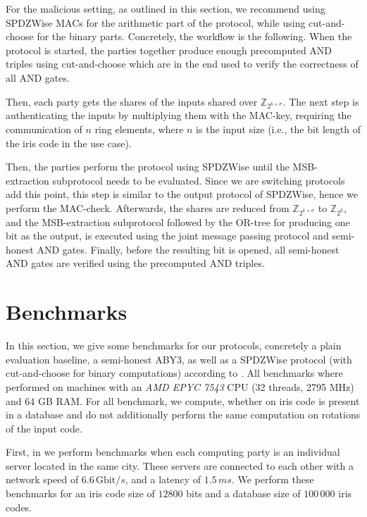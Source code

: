 \documentclass[a4paper,11pt,
]{article}
\newcommand{\Z}{\ensuremath{\mathbb{Z}}\xspace}
\begin{document}
For the malicious setting, as outlined in this section, we recommend using SPDZWise MACs  for the arithmetic part of the protocol, while using cut-and-choose  for the binary parts. Concretely, the workflow is the following. When the protocol is started, the parties together produce enough precomputed AND triples using cut-and-choose which are in the end used to verify the correctness of all AND gates.

Then, each party gets the shares of the inputs shared over $\Z_{2^{k + \sigma}}$. The next step is authenticating the inputs by multiplying them with the MAC-key, requiring the communication of $n$ ring elements, where $n$ is the input size (i.e., the bit length of the iris code in the use case).

Then, the parties perform the protocol using SPDZWise until the MSB-extraction subprotocol needs to be evaluated. Since we are switching protocols add this point, this step is similar to the output protocol of SPDZWise, hence we perform the MAC-check. Afterwards, the shares are reduced from $\Z_{2^{k + \sigma}}$ to $\Z_{2^k}$, and the MSB-extraction subprotocol followed by the OR-tree for producing one bit as the output, is executed using the joint message passing protocol and semi-honest AND gates. Finally, before the resulting bit is opened, all semi-honest AND gates are verified using the precomputed AND triples.


\section{Benchmarks} \label{sec::bench}

In this section, we give some benchmarks for our protocols, concretely a plain evaluation baseline, a semi-honest ABY3, as well as a SPDZWise protocol (with cut-and-choose for binary computations) according to . All benchmarks where performed on machines with an \textit{AMD EPYC 7543} CPU (32 threads, 2795 MHz) and 64 GB RAM. For all benchmark, we compute, whether on iris code is present in a database and do not additionally perform the same computation on rotations of the input code.

First, in  we perform benchmarks when each computing party is an individual server located in the same city. These servers are connected to each other with a network speed of $6.6\,\text{Gbit}/s$, and a latency of $1.5\,ms$. We perform these benchmarks for an iris code size of $12800$ bits and a database size of $100\,000$ iris codes.
\end{document}
